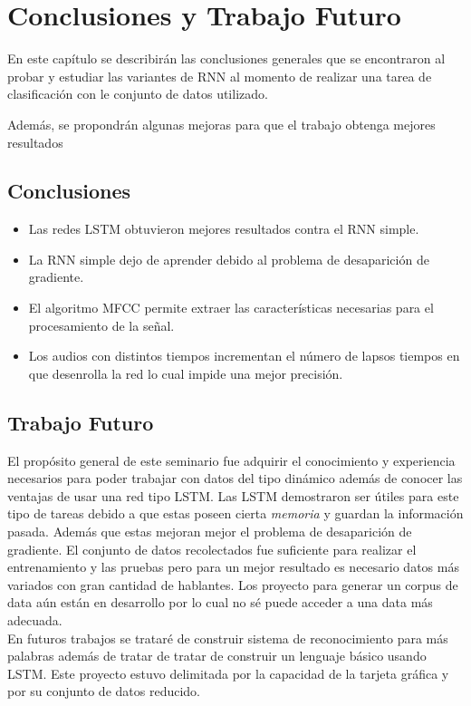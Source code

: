 \chapter{Conclusiones y Trabajo Futuro}
En este capítulo se describirán las conclusiones generales que se encontraron al probar y estudiar las variantes de RNN al momento de realizar una tarea de clasificación con le conjunto de datos utilizado.

Además, se propondrán algunas mejoras para que el trabajo obtenga mejores
resultados

\section{Conclusiones}

\begin{itemize}
	\item Las redes LSTM obtuvieron mejores resultados contra el RNN simple.
	\item La RNN simple dejo de aprender debido al problema de desaparición de gradiente.
	\item El algoritmo MFCC permite extraer las características necesarias para el procesamiento de la señal.
	\item Los audios con distintos tiempos incrementan el número de lapsos tiempos en que desenrolla la red lo cual impide una mejor precisión.
	
\end{itemize}

\section{Trabajo Futuro}

El propósito general de este seminario  fue adquirir el conocimiento y
experiencia necesarios para poder trabajar con datos del tipo dinámico además de conocer las ventajas de usar una red tipo LSTM.
Las LSTM demostraron ser útiles para este tipo de tareas debido a que estas poseen cierta \textit{memoria} y guardan la información pasada. Además que estas mejoran mejor el problema de desaparición de gradiente.
El conjunto de datos recolectados fue suficiente para realizar el entrenamiento y las pruebas pero para un mejor resultado es necesario datos más variados con gran cantidad de hablantes. Los proyecto para generar un corpus de data aún están en desarrollo por lo cual no sé puede acceder a una data más adecuada.\\
En futuros trabajos se trataré de construir sistema de reconocimiento para más palabras además de tratar de tratar de construir un lenguaje básico usando LSTM. Este proyecto estuvo delimitada por la capacidad de la tarjeta gráfica y por su conjunto de datos reducido. 

